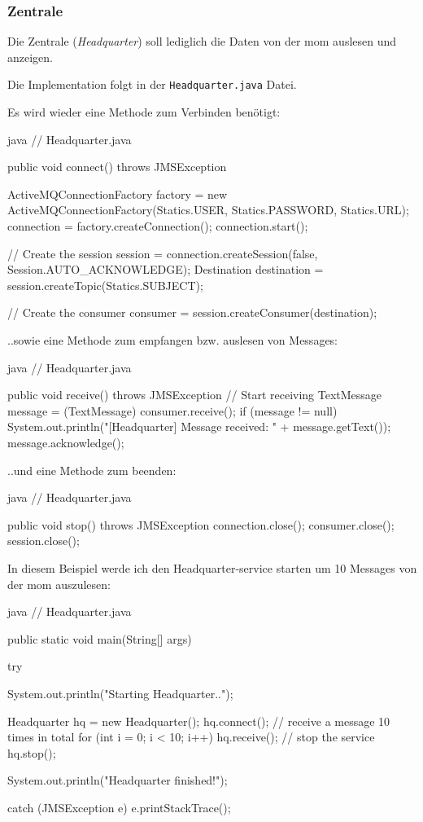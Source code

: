 \subsubsection{Zentrale}
\label{sec:headquarters}

Die Zentrale (\textit{Headquarter}) soll lediglich die Daten von der \gls{mom} auslesen und anzeigen.

Die Implementation folgt in der \texttt{Headquarter.java} Datei.

Es wird wieder eine Methode zum Verbinden benötigt:

\begin{code}{java}
// Headquarter.java

public void connect() throws JMSException {
    ActiveMQConnectionFactory factory = new ActiveMQConnectionFactory(Statics.USER, Statics.PASSWORD, Statics.URL);
    connection = factory.createConnection();
    connection.start();

    // Create the session
    session = connection.createSession(false, Session.AUTO_ACKNOWLEDGE);
    Destination destination = session.createTopic(Statics.SUBJECT);

    // Create the consumer
    consumer = session.createConsumer(destination);
}
\end{code}

..sowie eine Methode zum empfangen bzw. auslesen von Messages:

\begin{code}{java}
// Headquarter.java

public void receive() throws JMSException {
    // Start receiving
    TextMessage message = (TextMessage) consumer.receive();
    if (message != null) {
        System.out.println("[Headquarter] Message received: " + message.getText());
        message.acknowledge();
    }
}
\end{code}

..und eine Methode zum beenden:

\begin{code}{java}
// Headquarter.java

public void stop() throws JMSException {
    connection.close();
    consumer.close();
    session.close();
}
\end{code}

In diesem Beispiel werde ich den Headquarter-service starten um 10 Messages von der \gls{mom} auszulesen:

\begin{code}{java}
// Headquarter.java

public static void main(String[] args) {
    try {
        System.out.println("Starting Headquarter..");

        Headquarter hq = new Headquarter();
        hq.connect();
        // receive a message 10 times in total
        for (int i = 0; i < 10; i++) {
            hq.receive();
        }
        // stop the service
        hq.stop();

        System.out.println("Headquarter finished!");
    } catch (JMSException e) {
        e.printStackTrace();
    }
}
\end{code}
